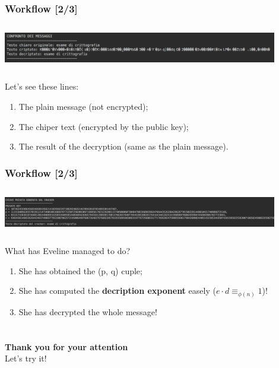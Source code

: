 \documentclass{beamer}
\begin{document}
    \begin{frame}
  
  \frametitle{Workflow [2/3]}
  
  \includegraphics[height=2cm, width=12cm]{img/testo_criptato}
  
  Let's see these lines:
 	\begin{enumerate}
 	\item The plain message (not encrypted);
 	\item The chiper text (encrypted by the public key);
 	\item The result of the decryption (same as the plain message).
 	\end{enumerate}
 
  \end{frame}
  
    \begin{frame}
  
  \frametitle{Workflow [2/3]}
  
  \includegraphics[height=2cm, width=12cm]{img/attacco}
  
  What has Eveline managed to do?
 	\begin{enumerate}
 	\item She has obtained the (p, q) cuple;
 	\item She has computed the \textbf{decription exponent} easely ($e \cdot d \equiv_{\phi(n)} 1$)!
 	\item She has decrypted the whole message!
 	\end{enumerate}
 
  \end{frame}
 
  
  \section*{}
  
    \begin{frame}
    \begin{center}
           \textbf{Thank you for your attention}\\
           Let's try it!
    \end{center}
  \end{frame}
\end{document}
